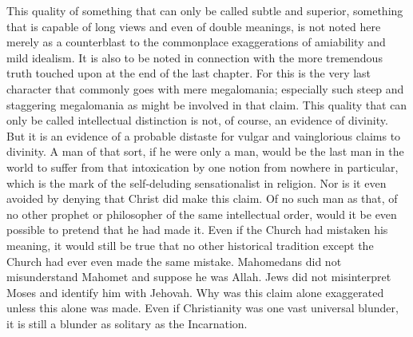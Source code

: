 This quality of something that can only be called subtle and superior, something that is capable of long views and even of double meanings, is not noted here merely as a counterblast to the commonplace exaggerations of amiability and mild idealism. It is also to be noted in connection with the more tremendous truth touched upon at the end of the last chapter. For this is the very last character that commonly goes with mere megalomania; especially such steep and staggering megalomania as might be involved in that claim. This quality that can only be called intellectual distinction is not, of course, an evidence of divinity. But it is an evidence of a probable distaste for vulgar and vainglorious claims to divinity. A man of that sort, if he were only a man, would be the last man in the world to suffer from that intoxication by one notion from nowhere in particular, which is the mark of the self-deluding sensationalist in religion. Nor is it even avoided by denying that Christ did make this claim. Of no such man as that, of no other prophet or philosopher of the same intellectual order, would it be even possible to pretend that he had made it. Even if the Church had mistaken his meaning, it would still be true that no other historical tradition except the Church had ever even made the same mistake. Mahomedans did not misunderstand Mahomet and suppose he was Allah. Jews did not misinterpret Moses and identify him with Jehovah. Why was this claim alone exaggerated unless this alone was made. Even if Christianity was one vast universal blunder, it is still a blunder as solitary as the Incarnation.

